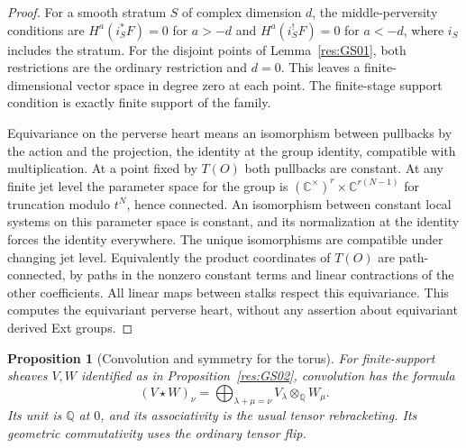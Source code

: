 \documentclass[11pt,oneside,openany]{book}
\newtheorem{proposition}[theorem]{Proposition}
\theoremstyle{definition}
\theoremstyle{remark}
\begin{document}
\begin{proof}
For a smooth stratum \(S\) of complex dimension \(d\), the
middle-perversity conditions are
\(H^a(i_S^*F)=0\) for \(a>-d\) and
\(H^a(i_S^!F)=0\) for \(a<-d\), where \(i_S\) includes the
stratum. For the disjoint points of Lemma~\ref{res:GS01}, both
restrictions are the ordinary restriction and \(d=0\).
This leaves a finite-dimensional vector space in degree zero
at each point. The finite-stage support condition is exactly
finite support of the family.

Equivariance on the perverse heart means an isomorphism between
pullbacks by the action and the projection, the identity at
the group identity, compatible with multiplication. At a point
fixed by \(T(O)\) both pullbacks are constant. At any finite jet
level the parameter space for the group is
\((\mathbb C^\times)^r\times \mathbb C^{r(N-1)}\) for truncation
modulo \(t^N\), hence connected. An isomorphism between constant
local systems on this parameter space is constant, and its
normalization at the identity forces the identity everywhere.
The unique isomorphisms are compatible under changing jet level.
Equivalently the product coordinates of \(T(O)\) are path-connected,
by paths in the nonzero constant terms and linear contractions of
the other coefficients. All linear maps between stalks respect
this equivariance. This computes the equivariant perverse heart,
without any assertion about equivariant derived Ext groups.
\end{proof}

\begin{proposition}[Convolution and symmetry for the torus]
\label{res:GS03}
For finite-support sheaves \(V,W\) identified as in
Proposition~\ref{res:GS02}, convolution has the formula
\[
 (V\star W)_\nu
   =\bigoplus_{\lambda+\mu=\nu} V_\lambda\otimes_{\mathbb Q} W_\mu .
\]
Its unit is \(\mathbb Q\) at \(0\), and its associativity is
the usual tensor rebracketing. Its geometric commutativity uses
the ordinary tensor flip.
\end{proposition}
\end{document}

